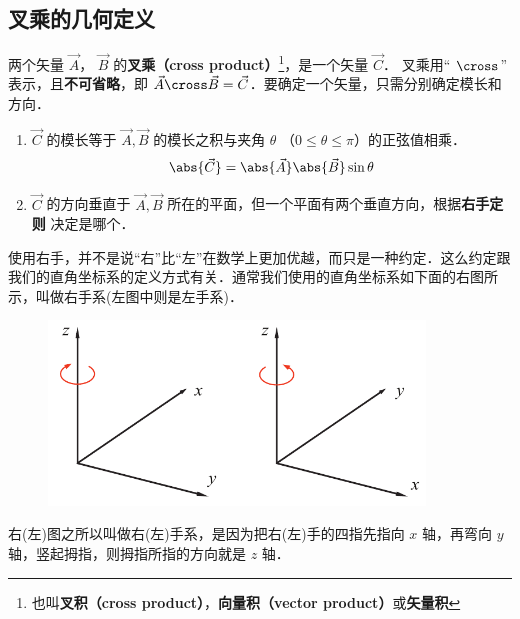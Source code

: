 

\subsection{叉乘的几何定义}

两个矢量 $\vec A$，  $\vec B$ 的\textbf{叉乘（cross product）}\footnote{也叫\textbf{叉积（cross product）}，\textbf{向量积（vector product）}或\textbf{矢量积} }，是一个矢量 $\vec C$．  叉乘用“ $\cross$” 表示，且\textbf{不可省略}，即 $ \vec A \cross \vec B = \vec C$．要确定一个矢量，只需分别确定模长和方向．

\begin{enumerate}
\item $\vec C$ 的模长等于 $\vec A, \vec B$ 的模长之积与夹角 $\theta$ （$0\le\theta \le\pi$）的正弦值相乘．
\begin{equation}\label{Cross_eq1}
\abs {\vec C}  = \abs {\vec A} \abs {\vec B}  \sin \theta 
\end{equation}
\item $\vec C$ 的方向垂直于 $\vec A, \vec B$ 所在的平面，但一个平面有两个垂直方向，根据\textbf{右手定则} 决定是哪个．
\end{enumerate}
使用右手，并不是说“右”比“左”在数学上更加优越，而只是一种约定．这么约定跟我们的直角坐标系的定义方式有关．通常我们使用的直角坐标系如下面的右图所示，叫做右手系(左图中则是左手系)．
\begin{figure}[h]
\centering
\includegraphics[width=10cm]{./figures/Cross.pdf}
\end{figure}
右(左)图之所以叫做右(左)手系，是因为把右(左)手的四指先指向 $x$ 轴，再弯向 $y$ 轴，竖起拇指，则拇指所指的方向就是 $z$ 轴．

